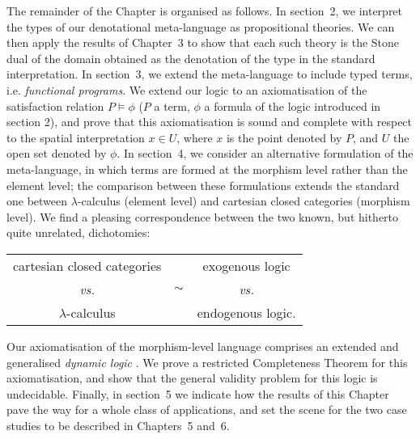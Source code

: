 The remainder of the Chapter is organised as follows.
In section~2, we interpret the types of our denotational meta-language
as propositional theories.
We can then apply the results of Chapter~3 to show that each such theory is the Stone dual of the domain obtained as the denotation of the type in the standard interpretation.
In section~3, we extend the meta-language to include typed terms, i.e. {\em functional programs}.
We extend our logic to an axiomatisation of the satisfaction relation $P \models \phi$ ($P$ a term, $\phi$ a formula of the logic introduced in section 2),
and prove that this axiomatisation is sound and complete with respect to the
spatial interpretation $x \in U$, where $x$ is the point denoted by $P$, and $U$ the open set denoted by $\phi$.
In section~4, we consider an alternative formulation of the meta-language, 
in which terms are formed at the morphism level rather than the element level;
the comparison between these formulations extends the standard one between
$\lambda$-calculus (element level) and cartesian closed categories (morphism level).
We find a pleasing correspondence between the two known, but hitherto quite unrelated, dichotomies:
\begin{center}
\begin{tabular}{ccc}
cartesian closed categories & & exogenous logic \\
{\it vs.} & ${\Large \sim}$ & {\it vs.} \\
$\lambda$-calculus & & endogenous logic.
\end{tabular}
\end{center}
Our axiomatisation of the morphism-level language comprises an extended and 
generalised {\em dynamic logic} \cite{Pra79,Har79}.
We prove a restricted Completeness Theorem for this axiomatisation,
and show that the general validity problem for this logic is undecidable.
Finally, in section~5 we indicate how the results of this Chapter pave the way
for a whole class of applications, and set the scene for the two case studies
to be described in Chapters~5 and~6.


